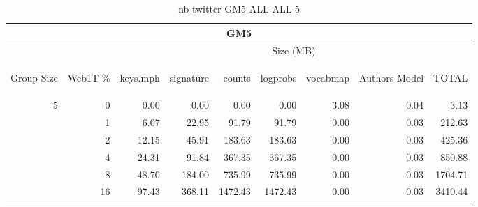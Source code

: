 \begin{center}
\begin{table}[htbp] 
 \begin{center}
\begin{tabular}{ | r | r | r | r | r | r | r | r | r |}
\hline
\multicolumn{9}{|c|}{GM5}\\
\hline
 & & \multicolumn{7}{|c|}{Size (MB)}\\ \cline{3-9}
\begin{sideways}Group Size\end{sideways} & \begin{sideways}Web1T \% \end{sideways} & \begin{sideways}keys.mph\end{sideways} & \begin{sideways}signature\end{sideways} & \begin{sideways}counts\end{sideways} & \begin{sideways}logprobs\end{sideways} & \begin{sideways}vocabmap\end{sideways} & \begin{sideways}Authors Model \end{sideways} & \begin{sideways}TOTAL\end{sideways}\\
\hline
\multirow{5}{*}{5}
 & 0 & 0.00 & 0.00 & 0.00 & 0.00 & 3.08 & 0.04 & 3.13\\ \cline{2-9}
 & 1 & 6.07 & 22.95 & 91.79 & 91.79 & 0.00 & 0.03 & 212.63\\ \cline{2-9}
 & 2 & 12.15 & 45.91 & 183.63 & 183.63 & 0.00 & 0.03 & 425.36\\ \cline{2-9}
 & 4 & 24.31 & 91.84 & 367.35 & 367.35 & 0.00 & 0.03 & 850.88\\ \cline{2-9}
 & 8 & 48.70 & 184.00 & 735.99 & 735.99 & 0.00 & 0.03 & 1704.71\\ \cline{2-9}
 & 16 & 97.43 & 368.11 & 1472.43 & 1472.43 & 0.00 & 0.03 & 3410.44\\ \cline{2-9}
\hline
\end{tabular}
\caption{nb-twitter-GM5-ALL-ALL-5}
\label{table:nb-twitter-GM5-ALL-ALL-5}
\end{center}
 \end{table}
\end{center}

